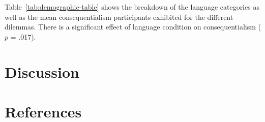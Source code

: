 \documentclass[
  man,floatsintext]{apa7}
\begin{document}
Table~\ref{tab:demographic-table} shows the breakdown of the language categories as well as the mean consequentialism participants exhibited for the different dilemmas. There is a significant effect of
language condition on consequentialism (\(p\) = .017).

\hypertarget{discussion}{%
\section{Discussion}\label{discussion}}

\newpage

\hypertarget{references}{%
\section{References}\label{references}}
\end{document}
